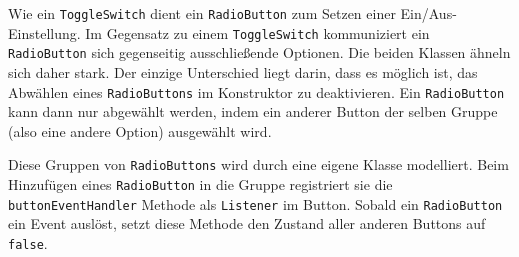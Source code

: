 		\medskip
		\begin{figure}
			\label{uml-radiobutton}
		\end{figure}
		Wie ein \texttt{ToggleSwitch} dient ein \texttt{RadioButton} zum Setzen einer Ein/Aus-Einstellung.
		Im Gegensatz zu einem \texttt{ToggleSwitch} kommuniziert ein \texttt{RadioButton} sich gegenseitig ausschließende Optionen.
		Die beiden Klassen ähneln sich daher stark. Der einzige Unterschied liegt darin, dass es möglich ist, das Abwählen eines
		\texttt{RadioButtons} im Konstruktor zu deaktivieren. Ein \texttt{RadioButton} kann dann nur abgewählt werden,
		indem ein anderer Button der selben Gruppe (also eine andere Option) ausgewählt wird.
		
		\medskip
		\begin{figure}
			\scalebox{0.75}{
				\begin{tikzpicture}
					
				\end{tikzpicture}
			}
			\label{uml-radiogroup}
		\end{figure}
		Diese Gruppen von \texttt{RadioButtons} wird durch eine eigene Klasse modelliert.
		Beim Hinzufügen eines \texttt{RadioButton} in die Gruppe registriert sie die \texttt{buttonEventHandler} Methode als \texttt{Listener} im Button.
		Sobald ein \texttt{RadioButton} ein Event auslöst, setzt diese Methode den Zustand aller anderen Buttons auf \texttt{false}.
		
